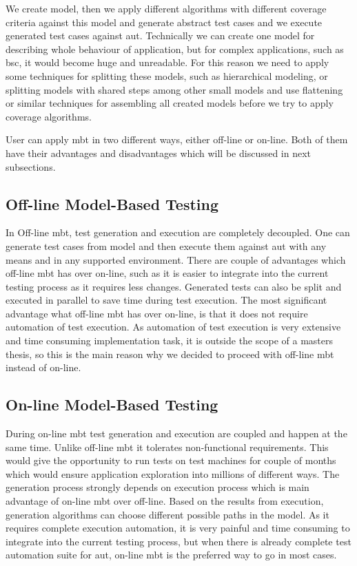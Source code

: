 We create model, then we apply different algorithms with different coverage criteria against this model and generate abstract test cases and we execute generated test cases against \acrlong{aut}. Technically we can create one model for describing whole behaviour of application, but for complex applications, such as \acrshort{bsc}, it would become huge and unreadable. For this reason we need to apply some techniques for splitting these models, such as hierarchical modeling, or splitting models with shared steps among other small models and use flattening or similar techniques for assembling all created models before we try to apply coverage algorithms.

\par
User can apply \acrshort{mbt} in two different ways, either off-line or on-line. Both of them have their advantages and disadvantages which will be discussed in next subsections.

\subsection{Off-line Model-Based Testing}
In Off-line \acrshort{mbt}, test generation and execution are completely decoupled. One can generate test cases from model and then execute them against \acrlong{aut} with any means and in any supported environment. There are couple of advantages which off-line \acrshort{mbt} has over on-line, such as it is easier to integrate into the current testing process as it requires less changes. Generated tests can also be split and executed in parallel to save time during test execution. The most significant advantage what off-line \acrshort{mbt} has over on-line, is that it does not require automation of test execution. As automation of test execution is very extensive and time consuming implementation task, it is outside the scope of a masters thesis, so this is the main reason why we decided to proceed with off-line \acrshort{mbt} instead of on-line.

\subsection{On-line Model-Based Testing}
During on-line \acrshort{mbt} test generation and execution are coupled and happen at the same time. Unlike off-line \acrshort{mbt} it tolerates non-functional requirements. This would give the opportunity to run tests on test machines for couple of months which would ensure application exploration into millions of different ways. The generation process strongly depends on execution process which is main advantage of on-line \acrshort{mbt} over off-line.    Based on the results from execution, generation algorithms can choose different possible paths in the model. As it requires complete execution automation, it is very painful and time consuming to integrate into the current testing process, but when there is already complete test automation suite for \acrlong{aut}, on-line \acrshort{mbt} is the preferred way to go in most cases.


